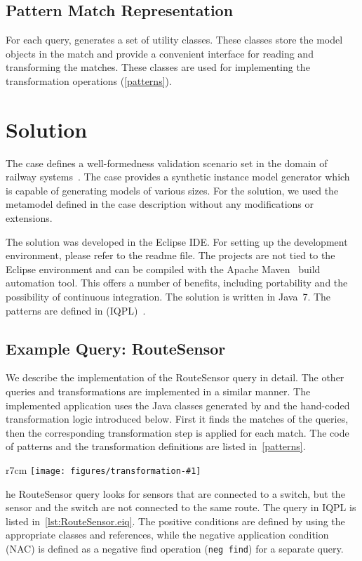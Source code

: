 \documentclass[submission,copyright,creativecommons]{eptcs}
\newcommand{\ttctransformation}[2]{
	\begin{wrapfigure}{r}{7cm}
		\centering
		\texttt{[image: figures/transformation-\#1]}
		\vspace{-3em}
	\end{wrapfigure}
}
\begin{document}
\subsection{Pattern Match Representation}

For each query, \eiq generates a set of utility classes. These classes store the model objects in the match and provide a convenient interface for reading and transforming the matches. These classes are used for implementing the transformation operations (\autoref{patterns}).

\section{Solution}

The case defines a well-formedness validation scenario set in the domain of railway systems~\cite{ttc-trainbenchmark-case}. The case provides a synthetic instance model generator which is capable of generating models of various sizes. For the solution, we used the metamodel defined in the case description without any modifications or extensions.

The solution was developed in the Eclipse IDE. For setting up the development environment, please refer to the readme file. The projects are not tied to the Eclipse environment and can be compiled with the Apache Maven~\cite{Maven} build automation tool. This offers a number of benefits, including portability and the possibility of continuous integration. The solution is written in Java~7. The patterns are defined in \iqpl (IQPL)~\cite{iqpl}.

\subsection{Example Query: \textsf{RouteSensor}}
\label{routesensor}
We describe the implementation of the \textsf{RouteSensor} query in detail. The other queries and transformations are implemented in a similar manner. The implemented application uses the Java classes generated by \eiq and the hand-coded transformation logic introduced below. First it finds the matches of the queries, then the corresponding transformation step is applied for each match. The code of patterns and the transformation definitions are listed in~\autoref{patterns}.

\ttctransformation{routesensor}

The \textsf{RouteSensor} query looks for sensors that are connected to a switch, but the sensor and the switch are not connected to the same route. The query in IQPL is listed in~\autoref{lst:RouteSensor.eiq}. The positive conditions are defined by using the appropriate classes and references, while the negative application condition (NAC) is defined as a negative find operation (\texttt{neg find}) for a separate query.
\end{document}
